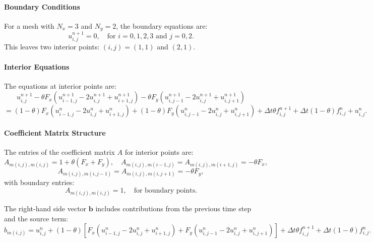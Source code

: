 \documentclass{article}
\begin{document}
			\paragraph{Boundary Conditions}
			For a mesh with \( N_x = 3 \) and \( N_y = 2 \), the boundary equations are:
			\[
			u_{i,j}^{n+1} = 0, \quad \text{for } i = 0, 1, 2, 3 \text{ and } j = 0, 2.
			\]
			This leaves two interior points: \( (i, j) = (1, 1) \) and \( (2, 1) \).
			
			\paragraph{Interior Equations}
			The equations at interior points are:
			\[
			u_{i,j}^{n+1} -  \theta F_x \left( u_{i-1,j}^{n+1} - 2u_{i,j}^{n+1} + u_{i+1,j}^{n+1} \right)
			-  \theta F_y \left( u_{i,j-1}^{n+1} - 2u_{i,j}^{n+1} + u_{i,j+1}^{n+1} \right)
			\]
			\[
			= (1-\theta) F_x \left( u_{i-1,j}^n - 2u_{i,j}^n + u_{i+1,j}^n \right)
			+ (1-\theta) F_y \left( u_{i,j-1}^n - 2u_{i,j}^n + u_{i,j+1}^n \right)
			+ \Delta t \theta f_{i,j}^{n+1} + \Delta t (1-\theta) f_{i,j}^n + u_{i,j}^n.
			\]
			

		
			
			\paragraph{Coefficient Matrix Structure}
			The entries of the coefficient matrix \( A \) for interior points are:
			\[
			A_{m(i,j), m(i,j)} = 1 + \theta (F_x + F_y), \quad
			A_{m(i,j), m(i-1,j)} = A_{m(i,j), m(i+1,j)} = -\theta F_x,
			\]
			\[
			A_{m(i,j), m(i,j-1)} = A_{m(i,j), m(i,j+1)} = -\theta F_y,
			\]
			with boundary entries:
			\[
			A_{m(i,j), m(i,j)} = 1, \quad \text{for boundary points.}
			\]
			
			The right-hand side vector \( \mathbf{b} \) includes contributions from the previous time step and the source term:
			\[
			b_{m(i,j)} = u_{i,j}^n + (1-\theta) \left[ F_x (u_{i-1,j}^n - 2u_{i,j}^n + u_{i+1,j}^n) + F_y (u_{i,j-1}^n - 2u_{i,j}^n + u_{i,j+1}^n) \right] + \Delta t \theta f_{i,j}^{n+1} + \Delta t (1-\theta) f_{i,j}^n.
			\]
			
\end{document}
